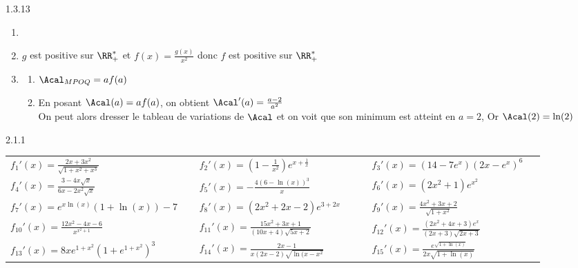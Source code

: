 \begin{Solution}{1.3.13}
	\begin{enumerate}
		\item {}
		\item $g$ est positive sur $\RR^*_+$ et $f(x)=\frac{g(x)}{x^2}$ donc $f$ est positive sur $\RR^*_+$
		\item \begin{enumerate}
			\item $\Acal_{MPOQ}=af(a)$
			\item En posant $\Acal(a)=af(a)$, on obtient $\Acal'(a)=\frac{a-2}{a^2}$\\
			On peut alors dresser le tableau de variations de $\Acal$ et on voit que son minimum est atteint en $a=2$, Or $\Acal(2)=\ln(2)$
		\end{enumerate}		
	\end{enumerate}
\end{Solution}
\begin{Solution}{2.1.1}
\renewcommand{\arraystretch}{2}
	\begin{tabular}{p{0.3\linewidth}p{0.3\linewidth}p{0.3\linewidth}}
	$f_1'(x)=\frac{2x+3x^2}{\sqrt{1+x^2+x^3}}$ & $f_2'(x)=\left(1-\frac{1}{x^2}\right)e^{x+\frac{1}{x}}$ & $f_3'(x)=\left(14-7e^x\right)(2x-e^x)^6$ \\
	$f_4'(x)=\frac{3-4x\sqrt{x}}{6x-2x^2\sqrt{x}}$ & $f_5'(x)=-\frac{4\left(6-\ln(x)\right)^3}{x}$ & $f_6'(x)=\left(2x^2+1\right)e^{x^2}$ \\
	$f_7'(x)=e^{x\ln(x)}(1+\ln(x))-7$ & $f_8'(x)=(2x^2+2x-2)e^{3+2x}$ & $f_9'(x)=\frac{4x^2+3x+2}{\sqrt{1+x^2}}$ \\	
	$f_{10}'(x)=\frac{12x^2-4x-6}{x^{x^2+1}}$ & $f_{11}'(x)=\frac{15x^2+3x+1}{(10x+4)\sqrt{5x+2}}$ & $f_{12}'(x)=\frac{(2x^2+4x+3)e^x}{(2x+3)\sqrt{2x+3}}$ \\
	$f_{13}'(x)=8xe^{1+x^2}\left(1+e^{1+x^2}\right)^{3}$ & $f_{14}'(x)=\frac{2x-1}{x(2x-2)\sqrt{\ln(x-x^2}}$ & $f_{15}'(x)=\frac{e^{\sqrt{1+\ln(x)}}}{2x\sqrt{1+\ln(x)}}$
\end{tabular}
\end{Solution}
